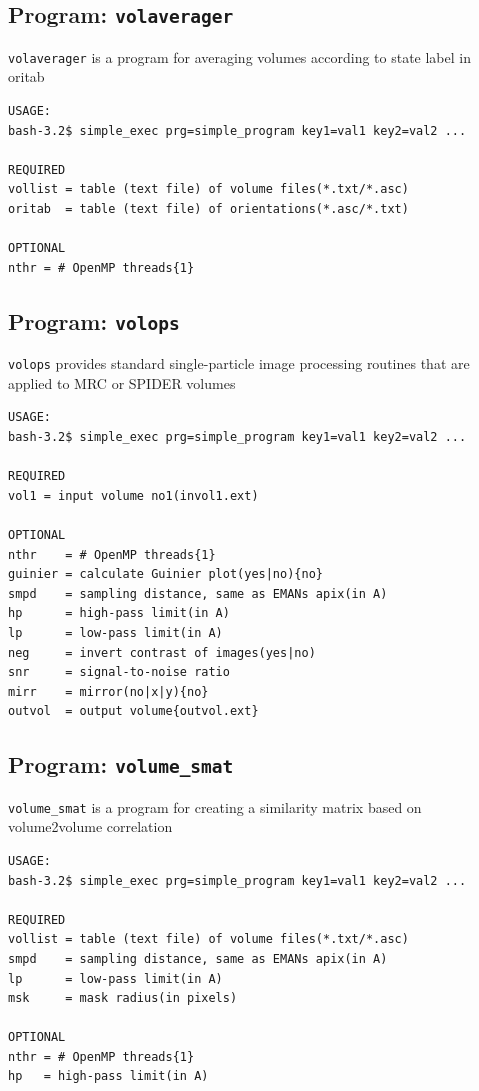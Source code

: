\documentclass[a4paper,11pt]{article}
\newcommand{\prgname}[1]{\textcolor{NavyBlue}{\texttt{#1}}}
\begin{document}
\subsection{Program: \prgname{volaverager}}
\label{volaverager}
\prgname{volaverager} is a program for averaging volumes according to state label in oritab 

\begin{verbatim}
USAGE:
bash-3.2$ simple_exec prg=simple_program key1=val1 key2=val2 ...

REQUIRED
vollist = table (text file) of volume files(*.txt/*.asc)
oritab  = table (text file) of orientations(*.asc/*.txt)

OPTIONAL
nthr = # OpenMP threads{1}
\end{verbatim}

\subsection{Program: \prgname{volops}}
\label{volops}
\prgname{volops} provides standard single-particle image processing routines that are applied to MRC or SPIDER volumes 

\begin{verbatim}
USAGE:
bash-3.2$ simple_exec prg=simple_program key1=val1 key2=val2 ...

REQUIRED
vol1 = input volume no1(invol1.ext)

OPTIONAL
nthr    = # OpenMP threads{1}
guinier = calculate Guinier plot(yes|no){no}
smpd    = sampling distance, same as EMANs apix(in A)
hp      = high-pass limit(in A)
lp      = low-pass limit(in A)
neg     = invert contrast of images(yes|no)
snr     = signal-to-noise ratio
mirr    = mirror(no|x|y){no}
outvol  = output volume{outvol.ext}
\end{verbatim}

\subsection{Program: \prgname{volume\_smat}}
\label{volume_smat}
\prgname{volume\_smat} is a program for creating a similarity matrix based on volume2volume correlation

\begin{verbatim}
USAGE:
bash-3.2$ simple_exec prg=simple_program key1=val1 key2=val2 ...

REQUIRED
vollist = table (text file) of volume files(*.txt/*.asc)
smpd    = sampling distance, same as EMANs apix(in A)
lp      = low-pass limit(in A)
msk     = mask radius(in pixels)

OPTIONAL
nthr = # OpenMP threads{1}
hp   = high-pass limit(in A)
\end{verbatim}
\end{document}
